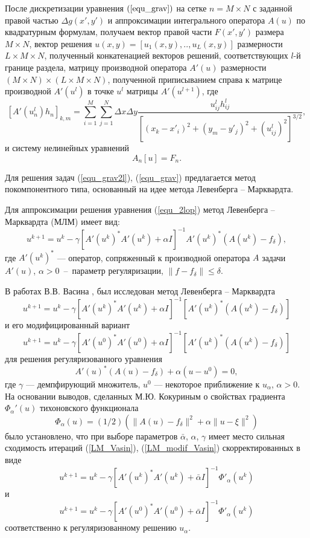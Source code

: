 После дискретизации уравнения $(\ref{equ_grav})$ на сетке $n=M\times N$ с заданной правой частью $\Delta g(x',y')$ и аппроксимации интегрального оператора $A(u)$ по квадратурным формулам, получаем вектор правой части $F(x',y')$ размера  $M\times N$, вектор решения $u(x,y)=[u_1(x,y),..,u_L(x,y)]$ размерности $L\times M\times N$, полученный конкатенацией векторов решений, соответствующих $l$-й границе раздела, матрицу производной оператора $A'(u)$ размерности $(M\times N)\times(L\times M\times N)$, полученной приписыванием справа к матрице производной $A'(u^l)$ в точке $u^l$ матрицы $A'(u^{l+1})$, где
\begin{equation}\label{op_grav_disc_form_mult}
[A'(u_n^l)h_n]_{k,m}=\sum\limits_{i=1}^{M}\sum\limits_{j=1}^{N}
\Delta x\Delta y\frac{u^l_{ij}h^l_{ij}}{[(x_k-x'_i)^2+(y_m-y'_j)^2+(u^l_{ij})^2]^{3/2}},
\end{equation} и систему нелинейных уравнений  
\begin{equation}\label{snl_equ}
A_n[u]=F_n.
\end{equation}

Для решения задач (\ref{equ_grav2l}), (\ref{equ_grav}) предлагается метод покомпонентного типа, основанный на идее метода Левенберга -- Марквардта. 

Для аппроксимации решения уравнения (\ref{equ_2lop}) метод Левенберга -- Марквардта (МЛМ) имеет вид:
\begin{equation}
u^{k+1}=u^k-\gamma[A'(u^k)^*A'(u^k)+\alpha I]^{-1} A'(u^k)^*(A(u^k)-f_\delta),
\end{equation}
где $A'(u^k)^*$ --- оператор, сопряженный к производной оператора $A$ задачи $A'(u)$, $\alpha>0$~--~параметр регуляризации, $\|f-f_\delta\|\le \delta.$
 
В работах В.В. Васина \cite{Vasin_2012}, \cite{VasPer_2011} был исследован метод Левенберга -- Марквардта
\begin{equation}\label{LM_Vasin}
u^{k+1}=u^k-\gamma[A'(u^k)^*A'(u^k)+\alpha I]^{-1} [A'(u^k)^*(A(u^k)-f_\delta)]
\end{equation} и его модифицированный вариант
\begin{equation}\label{LM_modif_Vasin}
u^{k+1}=u^k-\gamma[A'(u^0)^*A'(u^0)+\alpha I]^{-1} [A'(u^k)^*(A(u^k)-f_\delta)]
\end{equation} для решения регуляризованного уравнения
$$A'(u)^*(A(u)-f_\delta)+	\alpha (u-u^0)=0,$$
где $\gamma$ --- демпфирующий множитель, $u^0$ --- некоторое приближение к $u_\alpha$, $\alpha>0$. На основании выводов, сделанных М.Ю. Кокуриным \cite{Kok_2010} о свойствах градиента $\Phi_\alpha '(u)$ тихоновского функционала $$\Phi_\alpha(u)=(1/2)(\|A(u)-f_\delta\|^2+\alpha\|u-\xi\|^2)$$ было установлено, что при выборе параметров $\bar{\alpha}$, $\alpha$, $\gamma$ имеет место сильная сходимость итераций (\ref{LM_Vasin}), (\ref{LM_modif_Vasin}) скорректированных в виде
$$u^{k+1}=u^k-\gamma [A'(u^k)^*A'(u^k)+\bar\alpha I]^{-1}\Phi'_\alpha(u^k)$$
и
$$u^{k+1}=u^k-\gamma [A'(u^0)^*A'(u^0)+\bar\alpha I]^{-1}\Phi'_\alpha(u^k)$$
соответственно к регуляризованному решению $u_\alpha$.

